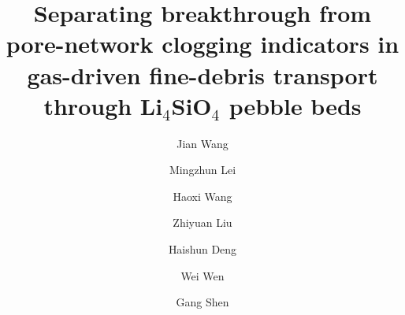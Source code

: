 \documentclass[preprint,12pt,authoryear]{elsarticle}
\newcommand{\LiSi}{Li$_4$SiO$_4$\xspace}
\begin{document}
\begin{frontmatter}

\title{\texorpdfstring{Separating breakthrough from pore-network clogging indicators in gas-driven fine-debris transport through \LiSi pebble beds}{Separating breakthrough from pore-network clogging indicators in gas-driven fine-debris transport through Li4SiO4 pebble beds}}

\author[aff1,aff2]{Jian Wang}
\author[aff2]{Mingzhun Lei}
\author[aff1]{Haoxi Wang}
\author[aff1]{Zhiyuan Liu}
\author[aff1]{Haishun Deng}
\author[aff1,aff2]{Wei Wen}
\author[aff1]{Gang Shen}


\address[aff1]{Anhui University of Science and Technology, Huainan, Anhui, China}
\address[aff2]{Institute of Plasma Physics, Hefei Institutes of Physical Science, Chinese Academy of Sciences, Hefei, Anhui, China}


\end{frontmatter}
\end{document}
